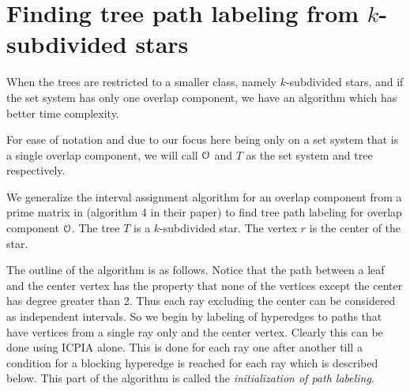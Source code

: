 \documentclass[a4paper,UKenglish,numberwithinsect]{lipics} %
\def\cO{{\cal O}}
\begin{document}
\section{Finding tree path labeling from $k$-subdivided stars}
\label{sec:ksubdivstar}
  When the trees are restricted to a smaller class,
namely $k$-subdivided stars, and if the set system has only one
overlap component, we have an algorithm which has better time
complexity.

\noindent
For ease of notation and due to our focus here being only on a set
system that is a single overlap component, we will call $\cO$ and $T$
as the set system and tree respectively.

\noindent
We generalize the interval assignment algorithm for an overlap
component from a prime matrix in \cite{nsnrs09} (algorithm 4 in their paper) to find
tree path labeling for overlap component $\cO$. The tree $T$ is a
$k$-subdivided star. The vertex $r$ is the center of the star.

\noindent
The outline of the algorithm is as follows. Notice that the path
between a leaf and the center vertex has the property that none of the
vertices except the center has degree greater than 2. Thus each ray
excluding the center can be considered as independent intervals.  So
we begin by labeling of hyperedges to paths that have vertices from a
single ray only and the center vertex. Clearly this can be done using
ICPIA alone. This is done for each ray one after another till a
condition for a blocking hyperedge is reached for each ray which is
described below. This part of the algorithm is called the {\em
  initialization of path labeling}.
\end{document}
